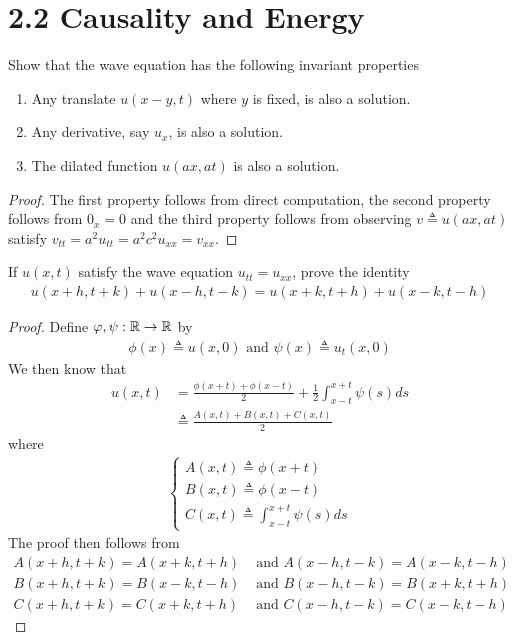 \documentclass{report}
\begin{document}
\section{2.2 Causality and Energy}
\begin{question}{}{}
Show that the wave equation has the following invariant properties 
\begin{enumerate}[label=(\alph*)]
  \item Any translate $u(x-y,t)$ where $y$ is fixed, is also a solution. 
  \item Any derivative, say $u_x$, is also a solution. 
  \item The dilated function $u(ax,at)$ is also a solution.
\end{enumerate}
\end{question}
\begin{proof}
The first property follows from direct computation, the second property follows from $0_x=0$ and the third property follows from  observing $v\triangleq u(ax,at)$ satisfy $v_{tt}=a^2u_{tt}=a^2c^2u_{xx}=v_{xx}$. 
\end{proof}
\begin{question}{}{}
If $u(x,t)$ satisfy the wave equation $u_{tt}=u_{xx}$, prove the identity 
\begin{align*}
u(x+h,t+k)+u(x-h,t-k)=u(x+k,t+h)+u(x-k,t-h)
\end{align*}
\end{question}
\begin{proof}
Define $\varphi,\psi :\mathbb{R}\rightarrow \mathbb{R}$ by 
\begin{align*}
\phi (x)\triangleq u(x,0)\text{ and }\psi (x)\triangleq u_t(x,0)
\end{align*}
We then know that 
\begin{align*}
u(x,t)&= \frac{\phi (x+t)+ \phi (x-t)}{2}+ \frac{1}{2}\int^{x+t}_{x-t}\psi (s)ds\\
&\triangleq \frac{A(x,t)+B(x,t)+C(x,t)}{2}
\end{align*}
where 
\begin{align*}
\begin{cases}
  A(x,t)\triangleq \phi (x+t)\\
  B(x,t)\triangleq \phi (x-t)\\
  C(x,t)\triangleq \int_{x-t}^{x+t}\psi (s)ds
\end{cases}
\end{align*}
The proof then follows from 
\begin{align*}
  A(x+h,t+k)=A(x+k,t+h)&\text{ and }A(x-h,t-k)=A(x-k,t-h)\\
B(x+h,t+k)=B(x-k,t-h)&\text{ and }B(x-h,t-k)=B(x+k,t+h)\\
C(x+h,t+k)=C(x+k,t+h)&\text{ and }C(x-h,t-k)=C(x-k,t-h)
\end{align*}
\end{proof}
\end{document}

